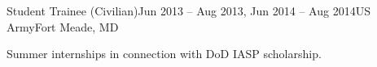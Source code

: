 
\def\PositionTitle{Student Trainee (Civilian)}
\def\PositionPeriod{Jun 2013 -- Aug 2013, Jun 2014 -- Aug 2014} %
\def\OrgName{US Army}
\def\OrgLocation{Fort Meade, MD}


\begin{rExperience}{\PositionTitle}{\PositionPeriod}{\OrgName}{\OrgLocation}

  \item Summer internships in connection with DoD IASP scholarship.

\end{rExperience}
